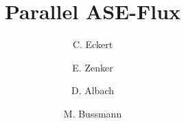 \documentclass[3p,twocolumn]{elsarticle}
\begin{document}
\title{Parallel ASE-Flux}

\author[hzdr]{C. Eckert}

\author[hzdr]{E. Zenker}

\author[hzdr]{D. Albach}

\author[hzdr]{M. Bussmann}

\address[hzdr]{
  Institute of Radiation Physics, 
  Helmholtz-Zentrum Dresden-Rossendorf e. V.,
  Bautzner Landstraße 400,
  01328 Dresden,  
  Germany
}




\maketitle




		


\end{document}
